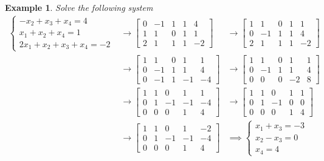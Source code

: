 \documentclass{article}
\newtheorem{ex}[theorem]{Example}
\begin{document}
\begin{ex}
Solve the following system \\
\[ \begin{aligned} \begin{cases} -x_2 + x_3 + x_4 = 4 \\ x_1 + x_2 + x_4 = 1 \\ 2x_1 + x_2 + x_3 + x_4 = -2 \end{cases} & \rightarrow \begin{bmatrix}0 & -1 & 1 & 1 &   4 \\ 1 &  1 &  0 &   1 &  1  \\ 2 &  1 &  1 &  1 &  -2 \end{bmatrix} & \rightarrow \begin{bmatrix}1  & 1 & 0 & 1 &   1 \\ 0 &  -1 &  1 &   1 &  4  \\ 2 &  1 &  1 &  1 &  -2 \end{bmatrix} \\ & \rightarrow \begin{bmatrix}1  & 1 & 0 & 1 &   1 \\ 0 &  -1 &  1 &   1 &  4  \\ 0 &  -1 &  1 &  -1 &  -4 \end{bmatrix}& \rightarrow \begin{bmatrix}1  & 1 & 0 & 1 &   1 \\ 0 &  -1 &  1 &   1 &  4  \\ 0 &  0 &  0 &  -2 &  8 \end{bmatrix} \\
& \rightarrow \begin{bmatrix}1  & 1 & 0 & 1 &   1 \\ 0 &  1 &  -1 &   -1 &  -4  \\ 0 &  0 &  0 &  1 &  4 \end{bmatrix}  &  \rightarrow  \begin{bmatrix}1  & 1 & 0 & 1 &   1 \\ 0 &  1 &  -1 &  0  &  0  \\ 0 &  0 &  0 &  1 &  4 \end{bmatrix} \\ 
& \rightarrow \begin{bmatrix}1  & 1 & 0 & 1 &   -2 \\ 0 &  1 &  -1 &   -1 &  -4  \\ 0 &  0 &  0 &  1 &  4 \end{bmatrix} & \implies \begin{cases} x_1 + x_3= -3 \\ x_2 - x_3 = 0 \\ x_4 = 4 \end{cases} \end{aligned} \]

\end{ex}
\end{document}
